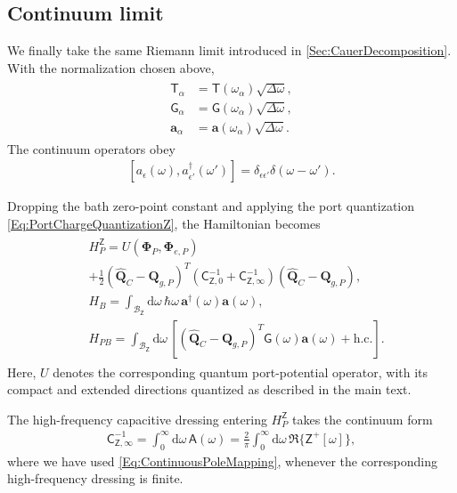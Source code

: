 \documentclass[prx,aps,twocolumn,article]{revtex4-2}
\newcommand{\msf}[1]{\mathsf{#1}}
\newcommand{\bsb}[1]{\boldsymbol{#1}}
\newcommand{\bPhi}{\bsb{\Phi}}
\newcommand{\bQ}{\bsb{Q}}
\newcommand{\ba}{\bsb{a}}
\newcommand{\msT}{\msf{T}}
\newcommand{\msZ}{\msf{Z}}
\newcommand{\msG}{\msf{G}}
\newcommand{\msC}{\msf{C}}
\newcommand{\msA}{\msf{A}}
\begin{document}
\subsection{Continuum limit}
We finally take the same Riemann limit introduced
in \cref{Sec:CauerDecomposition}. With the normalization chosen above,
\begin{align}
\begin{aligned}
    \msT_\alpha
    &=
    \msT(\omega_\alpha)\sqrt{\Delta\omega},
    \\
    \msG_\alpha
    &=
    \msG(\omega_\alpha)\sqrt{\Delta\omega},
    \\
    \ba_\alpha
    &=
    \ba(\omega_\alpha)\sqrt{\Delta\omega}.
\end{aligned}
\end{align}
The continuum operators obey
\begin{align}
    \left[
        a_\epsilon(\omega),
        a_{\epsilon'}^\dagger(\omega')
    \right]
    =
    \delta_{\epsilon\epsilon'}
    \delta(\omega-\omega').
\end{align}

Dropping the bath zero-point constant and applying the port
quantization \cref{Eq:PortChargeQuantizationZ}, the Hamiltonian becomes
\begin{align}
\begin{aligned}
    &H_P^\msZ
    =U(\bPhi_P,\bPhi_{e,P})
    \\
    &+
    \frac{1}{2}
    \left(
        \hat{\bQ}_C-\bQ_{g,P}
    \right)^T
    \left(
        \msC_{\msZ,0}^{-1}
        +
        \msC_{\msZ,\infty}^{-1}
    \right)
    \left(
        \hat{\bQ}_C-\bQ_{g,P}
    \right),
    \\
    &H_B
    =
    \int_{\mathcal B_{\msZ}}
    \mathrm{d}\omega\,
    \hbar\omega\,
    \ba^\dagger(\omega)
    \ba(\omega),
    \\
    &H_{PB}
    =
    \int_{\mathcal B_{\msZ}}
    \mathrm{d}\omega\,
    \left[
        \left(
            \hat{\bQ}_C-\bQ_{g,P}
        \right)^T
        \msG(\omega)
        \ba(\omega)
        +
        \mathrm{h.c.}
    \right].
\end{aligned}\nonumber
\end{align}
Here, $U$ denotes the corresponding quantum port-potential operator,
with its compact and extended directions quantized as described in
the main text.

The high-frequency capacitive dressing entering $H_P^\msZ$ takes the
continuum form
\begin{align}
    \msC_{\msZ,\infty}^{-1}
    =
    \int_0^\infty
    \mathrm{d}\omega\,
    \msA(\omega)
    =
    \frac{2}{\pi}
    \int_0^\infty
    \mathrm{d}\omega\,
    \Re\{\msZ^+[\omega]\},
    \label{Eq:DressedQubitHamiltonian}
\end{align}
where we have used \cref{Eq:ContinuousPoleMapping}, whenever the
corresponding high-frequency dressing is finite.
\end{document}
